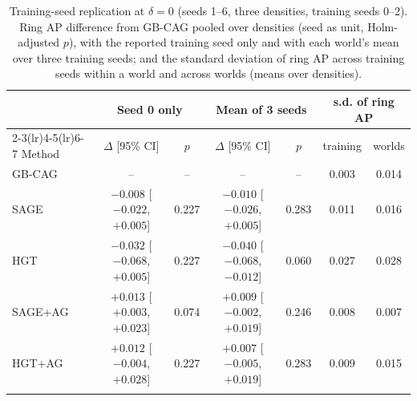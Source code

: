 \begin{table}[h]
\caption{Training-seed replication at $\delta=0$ (seeds 1--6, three densities, training seeds 0--2). Ring AP difference from GB-CAG pooled over densities (seed as unit, Holm-adjusted $p$), with the reported training seed only and with each world's mean over three training seeds; and the standard deviation of ring AP across training seeds within a world and across worlds (means over densities).}\label{tab:modelseeds}
\scriptsize
\setlength{\tabcolsep}{2pt}
\begin{tabular}{@{}lcccccc@{}}
\toprule
 & \multicolumn{2}{c}{Seed 0 only} & \multicolumn{2}{c}{Mean of 3 seeds} & \multicolumn{2}{c}{s.d. of ring AP} \\
\cmidrule(lr){2-3}\cmidrule(lr){4-5}\cmidrule(lr){6-7}
Method & $\Delta$ [95\% CI] & $p$ & $\Delta$ [95\% CI] & $p$ & training & worlds \\
\midrule
GB-CAG & -- & -- & -- & -- & 0.003 & 0.014 \\
SAGE & $-0.008$ [$-0.022$, $+0.005$] & 0.227 & $-0.010$ [$-0.026$, $+0.005$] & 0.283 & 0.011 & 0.016 \\
HGT & $-0.032$ [$-0.068$, $+0.005$] & 0.227 & $-0.040$ [$-0.068$, $-0.012$] & 0.060 & 0.027 & 0.028 \\
SAGE+AG & $+0.013$ [$+0.003$, $+0.023$] & 0.074 & $+0.009$ [$-0.002$, $+0.019$] & 0.246 & 0.008 & 0.007 \\
HGT+AG & $+0.012$ [$-0.004$, $+0.028$] & 0.227 & $+0.007$ [$-0.005$, $+0.019$] & 0.283 & 0.009 & 0.015 \\
\botrule
\end{tabular}
\end{table}